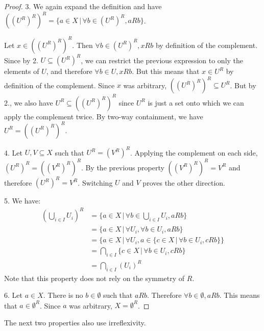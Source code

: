 \begin{mathSection}
\begin{proof}
		3. We again expand the definition and have $((U^{R})^{R})^{R} = \{ a \in X \, | \, \forall b \in (U^{R})^{R}, aRb \}$.
		
		Let $x \in ((U^{R})^{R})^{R}$. Then $\forall b \in (U^{R})^{R}, xRb$ by definition of the complement. Since by 2. $U \subseteq (U^{R})^{R}$, we can restrict the previous expression to only the elements of $U$, and therefore $\forall b \in U, xRb$. But this means that $x \in U^{R}$ by definition of the complement. Since $x$ was arbitrary, $((U^{R})^{R})^{R} \subseteq U^{R}$. But by 2., we also have $U^{R} \subseteq ((U^{R})^{R})^{R}$ since $U^{R}$ is just a set onto which we can apply the complement twice. By two-way containment, we have $U^{R} = ((U^{R})^{R})^{R}$.
		
		4. Let $U, V \subseteq X$ such that $U^{R} = (V^{R})^{R}$. Applying the complement on each side, $(U^{R})^{R} = ((V^{R})^{R})^{R}$. By the previous property $((V^{R})^{R})^{R} = V^{R}$ and therefore $(U^{R})^{R} = V^{R}$. Switching $U$ and $V$ proves the other direction.
		
		5. We have:
		\begin{equation*}
			\begin{aligned}
				(\bigcup_{i \in I} U_i )^{R} &= \{ a \in X \, | \, \forall b \in \bigcup_{i \in I} U_i, aRb \} \\
				&= \{ a \in X \, | \, \forall U_i, \forall  b \in U_i, aRb \} \\
				&= \{ a \in X \, | \, \forall U_i, a \in \{ c \in X \, | \,  \forall  b \in U_i, cRb \} \} \\
				&= \bigcap_{i \in I} \{ c \in X \, | \, \forall  b \in U_i, cRb\} \\
				&= \bigcap_{i \in I} (U_i)^{R}
			\end{aligned}
		\end{equation*}
		Note that this property does not rely on the symmetry of $R$.
		
		6. Let $a \in X$. There is no $b \in \emptyset$ such that $aRb$. Therefore $\forall b \in \emptyset, aRb$. This means that $a \in \emptyset^{R}$. Since $a$ was arbitrary, $X = \emptyset^{R}$.
	\end{proof}
\end{mathSection}

The next two properties also use irreflexivity.

